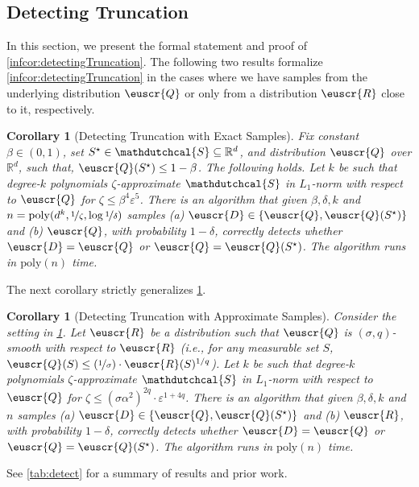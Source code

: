 \documentclass[11pt]{article}
\theoremstyle{plain}
\newtheorem{corollary}[theorem]{Corollary}
\theoremstyle{definition}
\theoremstyle{remark}
\newcommand{\inbrace}[1]{\left\{#1\right\}}
\newcommand{\R}{\mathbb{R}}
\newcommand{\nfrac}[2]{\nicefrac{#1}{#2}}
\newcommand{\poly}{\mathrm{poly}}
\newcommand{\eps}{\varepsilon}
\newcommand{\customcal}[1]{\euscr{#1}}
\newcommand{\cD}{\customcal{D}}
\newcommand{\cQ}{\customcal{Q}}
\newcommand{\cR}{\customcal{R}}
\newcommand{\ie}{\textit{i.e.}}
\newcommand{\hypo}[1]{\mathdutchcal{#1}}
\newcommand{\hyS}{\hypo{S}}
\begin{document}
    \subsection{Detecting Truncation}  
    \label{sec:application:detectingTruncation} 
        In this section, we present the formal statement and proof of \cref{infcor:detectingTruncation}. 
        The following two results formalize \cref{infcor:detectingTruncation} in the cases where we have samples from the underlying distribution $\cQ$ or only from a distribution $\cR$ close to it, respectively.
        \begin{corollary}[Detecting Truncation with Exact Samples]\label{cor:detectingTruncation}
            Fix constant $\beta\in (0,1)$, set $S^\star\in \hyS \subseteq \R^d$, and distribution $\cQ$ over $\R^d$, such that, $\cQ(S^\star)\leq 1-\beta$.
            The following holds. 
                    Let $k$ be such that degree-$k$ polynomials $\zeta$-approximate $\hyS$ in $L_1$-norm with respect to $\cQ$ for $\zeta\leq \beta^4 \eps^{5}$.
                    There is an algorithm that given $\beta,\delta,k$ and $n=\poly(d^k,\nfrac{1}{\zeta},\log{\nfrac{1}{\delta}})$ samples (a) $\cD\in\inbrace{\cQ,\cQ(S^\star)}$ and (b) $\cQ$, with probability $1-\delta$, correctly detects whether $\cD=\cQ$ or $\cQ=\cQ(S^\star)$.
                    The algorithm runs in $\poly(n)$ time.
        \end{corollary}
        The next corollary strictly generalizes \cref{cor:detectingTruncation}.
        \begin{corollary}[Detecting Truncation with Approximate Samples]
            \label{cor:detectingTruncation:gen}
            Consider the setting in \cref{cor:detectingTruncation}.
            Let $\cR$ be a distribution such that $\cQ$ is $(\sigma,q)$-smooth with respect to $\cR$ (\ie{}, for any measurable set $S$, $\cQ(S)\leq (\nfrac{1}{\sigma})\cdot \cR(S)^{1/q}$).
                    Let $k$ be such that degree-$k$ polynomials $\zeta$-approximate $\hyS$ in $L_1$-norm with respect to $\cQ$ for $\zeta\leq ({\sigma\alpha^2}{})^{2q}\cdot \eps^{1+4q}$.
                    There is an algorithm that given $\beta,\delta,k$ and $n$ samples (a) $\cD\in\inbrace{\cQ,\cQ(S^\star)}$ and (b) $\cR$, with probability $1-\delta$, correctly detects whether $\cD=\cQ$ or $\cQ=\cQ(S^\star)$.
                    The algorithm runs in $\poly(n)$ time.
        \end{corollary}
        See \cref{tab:detect} for a summary of results and prior work. 
\end{document}

